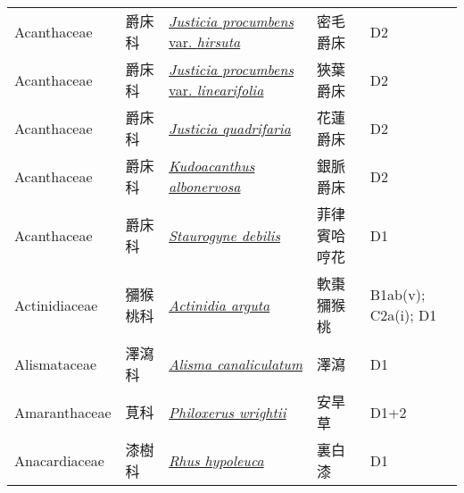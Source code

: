 {\begin{longtable}{p{2.5cm}p{2cm}p{5cm}p{2.5cm}p{3cm}}
    Acanthaceae & 爵床科 & \href{http://www.theplantlist.org/tpl1.1/search?q=Justicia+procumbens+var.+hirsuta}{\textit{Justicia procumbens} var. \textit{hirsuta} } & 密毛爵床 & D2 \index{Justicia@\textit{Justicia}!procumbens@\textit{procumbens}!var. hirsuta@var. \textit{hirsuta}}  \index{密毛爵床} \\
    Acanthaceae & 爵床科 & \href{http://www.theplantlist.org/tpl1.1/search?q=Justicia+procumbens+var.+linearifolia}{\textit{Justicia procumbens} var. \textit{linearifolia} } & 狹葉爵床 & D2 \index{Justicia@\textit{Justicia}!procumbens@\textit{procumbens}!var. linearifolia@var. \textit{linearifolia}}  \index{狹葉爵床} \\
    Acanthaceae & 爵床科 & \href{http://www.theplantlist.org/tpl1.1/search?q=Justicia+quadrifaria}{\textit{Justicia quadrifaria} } & 花蓮爵床 & D2 \index{Justicia@\textit{Justicia}!quadrifaria@\textit{quadrifaria}}  \index{花蓮爵床} \\
    Acanthaceae & 爵床科 & \href{http://www.theplantlist.org/tpl1.1/search?q=Kudoacanthus+albonervosa}{\textit{Kudoacanthus albonervosa} } & 銀脈爵床 & D2 \index{Kudoacanthus@\textit{Kudoacanthus}!albonervosa@\textit{albonervosa}}  \index{銀脈爵床} \\
    Acanthaceae & 爵床科 & \href{http://www.theplantlist.org/tpl1.1/search?q=Staurogyne+debilis}{\textit{Staurogyne debilis} } & 菲律賓哈哼花 & D1 \index{Staurogyne@\textit{Staurogyne}!debilis@\textit{debilis}}  \index{菲律賓哈哼花} \\
    Actinidiaceae & 獼猴桃科 & \href{http://www.theplantlist.org/tpl1.1/search?q=Actinidia+arguta}{\textit{Actinidia arguta} } & 軟棗獼猴桃 & B1ab(v); C2a(i); D1 \index{Actinidia@\textit{Actinidia}!arguta@\textit{arguta}}  \index{軟棗獼猴桃} \\
    Alismataceae & 澤瀉科 & \href{http://www.theplantlist.org/tpl1.1/search?q=Alisma+canaliculatum}{\textit{Alisma canaliculatum} } & 澤瀉 & D1 \index{Alisma@\textit{Alisma}!canaliculatum@\textit{canaliculatum}}  \index{澤瀉} \\
    Amaranthaceae & 莧科 & \href{http://www.theplantlist.org/tpl1.1/search?q=Philoxerus+wrightii}{\textit{Philoxerus wrightii} } & 安旱草 & D1+2 \index{Philoxerus@\textit{Philoxerus}!wrightii@\textit{wrightii}}  \index{安旱草} \\
    Anacardiaceae & 漆樹科 & \href{http://www.theplantlist.org/tpl1.1/search?q=Rhus+hypoleuca}{\textit{Rhus hypoleuca} } & 裏白漆 & D1 \index{Rhus@\textit{Rhus}!hypoleuca@\textit{hypoleuca}}  \index{裏白漆} \\

\end{longtable}}
